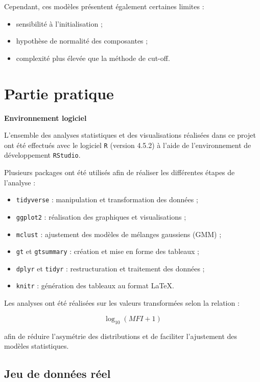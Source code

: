 \documentclass[a4paper]{article}
\begin{document}
Cependant, ces modèles présentent également certaines limites :

\begin{itemize}
    \item sensibilité à l’initialisation ;
    \item hypothèse de normalité des composantes ;
    \item complexité plus élevée que la méthode de cut-off.
\end{itemize}

\section{Partie pratique}

\textbf{Environnement logiciel}

L’ensemble des analyses statistiques et des visualisations réalisées dans ce projet ont été effectués avec le logiciel \texttt{R} (version 4.5.2) à l’aide de l’environnement de développement \texttt{RStudio}. 

\newpage 

Plusieurs packages ont été utilisés afin de réaliser les différentes étapes de l’analyse :

\begin{itemize}
    \item \texttt{tidyverse} : manipulation et transformation des données ;
    \item \texttt{ggplot2} : réalisation des graphiques et visualisations ;
    \item \texttt{mclust} : ajustement des modèles de mélanges gaussiens (GMM) ;
    \item \texttt{gt} et \texttt{gtsummary} : création et mise en forme des tableaux ;
    \item \texttt{dplyr} et \texttt{tidyr} : restructuration et traitement des données ;
    \item \texttt{knitr} : génération des tableaux au format \LaTeX.
\end{itemize}

Les analyses ont été réalisées sur les valeurs transformées selon la relation :

\[
\log_{10}(MFI + 1)
\]

afin de réduire l’asymétrie des distributions et de faciliter l’ajustement des modèles statistiques.

\subsection{Jeu de données réel}
\end{document}

